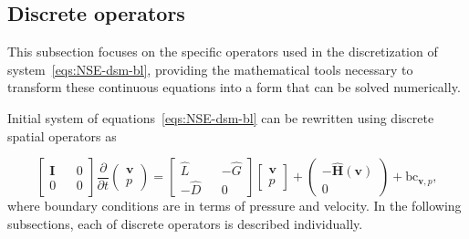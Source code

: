 \documentclass{article}
\begin{document}
\subsection{Discrete operators}

This subsection focuses on the specific operators used in the discretization of system~\eqref{eqs:NSE-dsm-bl}, providing the mathematical tools necessary to transform these continuous equations into a form that can be solved numerically.

Initial system of equations~\eqref{eqs:NSE-dsm-bl} can be rewritten using discrete spatial operators as

\begin{equation}\label{eqn:nse-matrix}
            \begin{bmatrix}
                  \mathbf{I} && 0 \\ 
                  0 && 0
            \end{bmatrix}
            \frac{\partial }{\partial t} 
            \begin{pmatrix}
                  \boldsymbol{v} \\ 
                  p
            \end{pmatrix}
            =
            \begin{bmatrix}
                  \hat{L} && - \hat{G} \\ 
                  -\hat{D} && 0
            \end{bmatrix}
            \begin{bmatrix}
                  \boldsymbol{v} \\
                  p
            \end{bmatrix}
            +
            \begin{pmatrix}
                  -\mathbf{\hat{H}}(\boldsymbol{v})\\
                  0
            \end{pmatrix} + \text{bc}_{\boldsymbol{v},p},
        \end{equation}
where boundary conditions are in terms of pressure and velocity. In the following subsections, each of discrete operators is described individually. 

\end{document}
